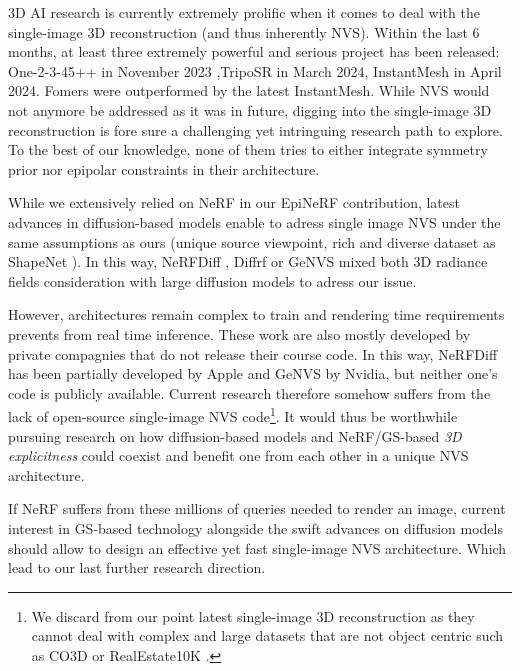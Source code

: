 3D \ac{AI} research is currently extremely prolific when it comes to deal with the single-image 3D reconstruction (and thus inherently \ac{NVS}). Within the last 6 months, at least three extremely powerful and serious project has been released:  One-2-3-45++ \citep{liu2023one2345++} in November 2023 ,TripoSR \citep{tochilkin2024triposr} in March 2024, InstantMesh \citep{xu2024instantmesh} in April 2024. Fomers were outperformed by the latest InstantMesh. While \ac{NVS} would not anymore be addressed as it was in future, digging into the single-image 3D reconstruction is fore sure a challenging yet intringuing research path to explore. To the best of our knowledge, none of them tries to either integrate symmetry prior nor epipolar constraints in their architecture.


While we extensively relied on \ac{NeRF} in our EpiNeRF contribution, latest advances in diffusion-based models enable to adress single image \ac{NVS} under the same assumptions as ours (unique source viewpoint, rich and diverse dataset as ShapeNet \citep{chang2015shapenet}). In this way, NeRFDiff \citep{gu2023nerfdiff}, Diffrf \citep{muller2023diffrf} or GeNVS \citep{chan2023genvs} mixed both 3D radiance fields consideration with large diffusion models to adress our issue. 

However, architectures remain complex to train and rendering time requirements prevents from real time inference. These work are also mostly developed by private compagnies that do not release their course code. In this way, NeRFDiff has been partially developed by Apple and GeNVS by Nvidia, but neither one's code is publicly available. Current research therefore somehow suffers from the lack of open-source single-image \ac{NVS} code\footnote{We discard from our point latest single-image 3D reconstruction as they cannot deal with complex and large datasets that are not object centric such as CO3D \citep{reizenstein2021common}or RealEstate10K \citep{zhou2018stereo}.}. It would thus be worthwhile pursuing research on how diffusion-based models and \ac{NeRF}/\ac{GS}-based \textit{3D explicitness} could coexist and benefit one from each other in a unique \ac{NVS} architecture.

If \ac{NeRF} suffers from these millions of queries needed to render an image, current interest in \ac{GS}-based technology alongside the swift advances on diffusion models should allow to design an effective yet fast single-image \ac{NVS} architecture. Which lead to our last further research direction. 

